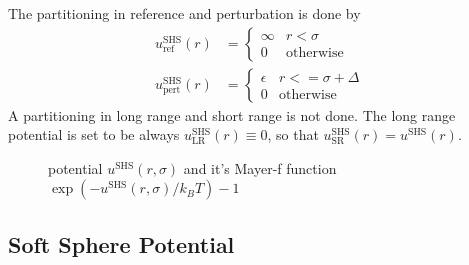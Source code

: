 The partitioning in reference and perturbation is done by
\begin{align}
u^\text{SHS}_\text{ref}(r) &=
\begin{cases}
\infty & r < \sigma \\
0        & \mbox{otherwise}
\end{cases}
\\
u^\text{SHS}_\text{pert}(r) &=
\begin{cases}
\epsilon  & r <= \sigma +\Delta\\
0         & \mbox{otherwise}
\end{cases}
\end{align}
A partitioning in long range and short range is not done. The long range potential
is set to be always $u^\text{SHS}_\text{LR}(r) \equiv 0$, so that
$u^\text{SHS}_\text{SR}(r)= u^\text{SHS}(r)$.

\begin{figure}[htb]
\centering
  \quad
  \caption{potential $u^\text{SHS}(r,\sigma)$ and it's Mayer-f function $\exp(-u^\text{SHS}(r,\sigma)/k_BT)-1$}
\end{figure}

\clearpage
\subsection{Soft Sphere Potential}
~\\

